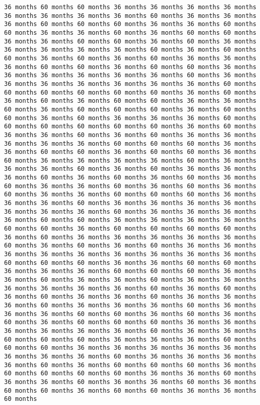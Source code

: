 \documentclass[11pt]{article}
\begin{document}
\begin{Verbatim}[commandchars=\\\{\}, frame=single, framerule=2mm, rulecolor=\color{outerrorbackground}]
36 months 60 months 60 months 36 months 36 months 36 months 36 months 36 months 36 months 36 months 36 months 60 months 36 months 36 months 36 months 60 months 60 months 60 months 36 months 36 months 60 months 60 months 36 months 36 months 60 months 36 months 60 months 60 months 36 months 36 months 60 months 60 months 36 months 60 months 36 months 36 months 36 months 36 months 36 months 60 months 36 months 60 months 60 months 36 months 60 months 36 months 60 months 36 months 36 months 36 months 60 months 60 months 36 months 60 months 60 months 36 months 36 months 36 months 36 months 36 months 36 months 60 months 36 months 36 months 36 months 36 months 36 months 36 months 36 months 60 months 60 months 60 months 60 months 60 months 60 months 36 months 60 months 36 months 60 months 36 months 60 months 60 months 36 months 36 months 60 months 36 months 60 months 60 months 60 months 36 months 60 months 60 months 36 months 60 months 36 months 36 months 36 months 60 months 60 months 60 months 60 months 60 months 60 months 36 months 60 months 36 months 36 months 60 months 36 months 60 months 36 months 36 months 36 months 36 months 36 months 60 months 60 months 60 months 36 months 36 months 60 months 60 months 36 months 60 months 60 months 36 months 60 months 36 months 36 months 36 months 36 months 60 months 36 months 36 months 36 months 60 months 36 months 60 months 36 months 36 months 36 months 60 months 36 months 60 months 36 months 60 months 36 months 60 months 36 months 36 months 60 months 36 months 60 months 36 months 60 months 36 months 36 months 60 months 60 months 60 months 36 months 36 months 36 months 60 months 36 months 36 months 36 months 36 months 36 months 36 months 36 months 60 months 36 months 36 months 36 months 36 months 60 months 60 months 36 months 36 months 36 months 36 months 60 months 60 months 36 months 60 months 60 months 60 months 60 months 36 months 60 months 36 months 36 months 36 months 36 months 36 months 60 months 36 months 60 months 36 months 60 months 36 months 36 months 36 months 36 months 36 months 36 months 36 months 36 months 36 months 60 months 60 months 60 months 36 months 36 months 60 months 60 months 36 months 36 months 36 months 60 months 60 months 60 months 36 months 36 months 60 months 36 months 36 months 60 months 36 months 36 months 36 months 36 months 36 months 36 months 60 months 36 months 60 months 36 months 60 months 36 months 36 months 60 months 36 months 36 months 36 months 60 months 36 months 36 months 36 months 60 months 36 months 36 months 36 months 60 months 60 months 36 months 60 months 36 months 60 months 36 months 60 months 60 months 60 months 36 months 36 months 36 months 36 months 36 months 36 months 60 months 36 months 36 months 60 months 60 months 60 months 36 months 36 months 36 months 60 months 60 months 60 months 36 months 36 months 36 months 36 months 36 months 36 months 36 months 36 months 60 months 36 months 36 months 36 months 36 months 60 months 36 months 60 months 60 months 60 months 36 months 60 months 60 months 60 months 60 months 36 months 36 months 60 months 36 months 36 months 60 months 36 months 36 months 60 months 36 months 60 months 60 months 36 months 60 months 60 months 36 months 36 months 60 months 
\end{Verbatim}
\end{document}
